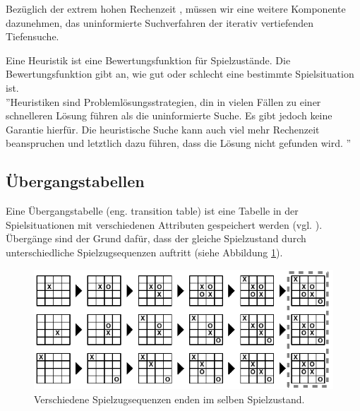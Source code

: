 Bezüglich der extrem hohen Rechenzeit , müssen wir eine weitere Komponente dazunehmen, das uninformierte Suchverfahren der iterativ vertiefenden Tiefensuche.

Eine Heuristik ist eine Bewertungsfunktion für Spielzustände. Die Bewertungsfunktion gibt an, wie gut oder schlecht eine bestimmte Spielsituation ist. \\

''Heuristiken sind Problemlösungsstrategien, din in vielen Fällen zu einer schnelleren Lösung führen als die uninformierte Suche. Es gibt jedoch keine Garantie hierfür. Die heuristische Suche kann auch viel mehr Rechenzeit beanspruchen und letztlich dazu führen, dass die Lösung nicht gefunden wird.  \cite[105]{Ertel}''\\






















\subsection{Übergangstabellen}
\label{subsec:Übergangstabellen}
Eine Übergangstabelle (eng. transition table) ist eine Tabelle in der Spielsituationen mit verschiedenen Attributen gespeichert werden (vgl. \cite[215\psq]{Russell}). Übergänge sind der Grund dafür, dass der gleiche Spielzustand durch unterschiedliche Spielzugsequenzen auftritt (siehe Abbildung \ref{fig:transitionen_tictactoe}). \\

\begin{figure}[!htbp]
  \centering
  \includegraphics{inhalt/abbildungen/transitionen_tictactoe.pdf}
  \caption{Verschiedene Spielzugsequenzen enden im selben Spielzustand.}
  \label{fig:transitionen_tictactoe}
\end{figure} 


